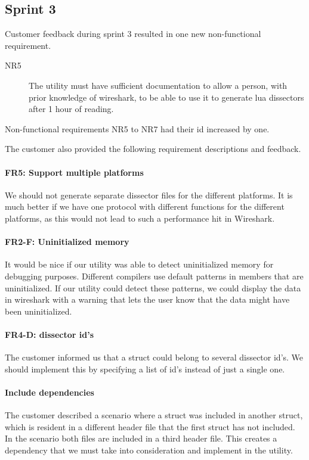 \subsection{Sprint 3}
\label{sec:req:sprint3evo}
Customer feedback during sprint 3 resulted in one new non-functional requirement.
\begin{description}
	\item[NR5] The \gls{utility} must have sufficient documentation to allow a person, with prior knowledge of \Gls{wireshark}, to be able to use it to generate \Gls{lua} \glspl{dissector} after 1 hour of reading.
\end{description}
Non-functional requirements NR5 to NR7 had their id increased by one.

\noindent The customer also provided the following requirement descriptions
and feedback.
\paragraph{FR5: Support multiple platforms}
We should not generate separate \gls{dissector} files for the different
platforms. It is much better if we have one \gls{protocol} with different
functions for the different platforms, as this would not lead to such a
performance hit in Wireshark.

\paragraph{FR2-F: Uninitialized memory}
It would be nice if our \gls{utility} was able to detect uninitialized memory
for debugging purposes. Different compilers use default patterns in
\glspl{member} that are uninitialized. If our \gls{utility} could detect these
patterns, we could display the data in \Gls{wireshark} with a warning that
lets the user know that the data might have been uninitialized.

\paragraph{FR4-D: \Gls{dissector} id's}
The customer informed us that a \gls{struct} could belong to several
\gls{dissector} id's. We should implement this by specifying a list of id's
instead of just a single one.

\paragraph{Include dependencies}
The customer described a scenario where a \gls{struct} was included in another
\gls{struct}, which is resident in a different \gls{header} file that the first
\gls{struct} has not included. In the scenario both files are included in a third
\gls{header} file. This creates a dependency that we must take into consideration
and implement in the \gls{utility}.

